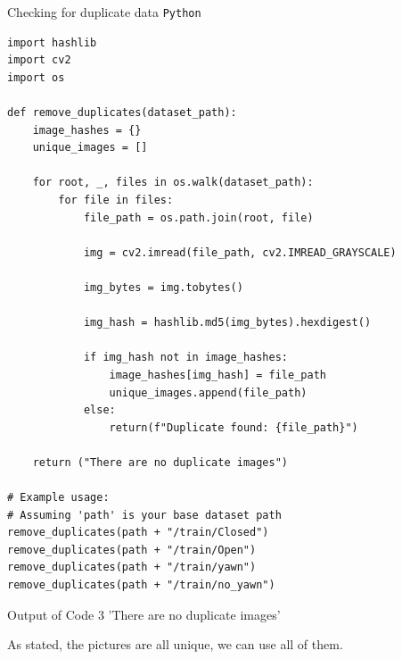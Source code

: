 \documentclass{modeleRapport}
\begin{document}
\begin{codebox}{Checking for duplicate data \texttt{Python}}
\begin{verbatim}
import hashlib
import cv2
import os

def remove_duplicates(dataset_path):
    image_hashes = {}
    unique_images = []

    for root, _, files in os.walk(dataset_path):  
        for file in files:
            file_path = os.path.join(root, file)  

            img = cv2.imread(file_path, cv2.IMREAD_GRAYSCALE)

            img_bytes = img.tobytes()

            img_hash = hashlib.md5(img_bytes).hexdigest()

            if img_hash not in image_hashes:
                image_hashes[img_hash] = file_path
                unique_images.append(file_path)
            else:
                return(f"Duplicate found: {file_path}")

    return ("There are no duplicate images")

# Example usage:
# Assuming 'path' is your base dataset path
remove_duplicates(path + "/train/Closed")
remove_duplicates(path + "/train/Open")
remove_duplicates(path + "/train/yawn")
remove_duplicates(path + "/train/no_yawn")
\end{verbatim}
\end{codebox}

\begin{codebox}[OutputB]{ Output of Code 3}
'There are no duplicate images'
\end{codebox}

As stated, the pictures are all unique, we can use all of them.
\end{document}
